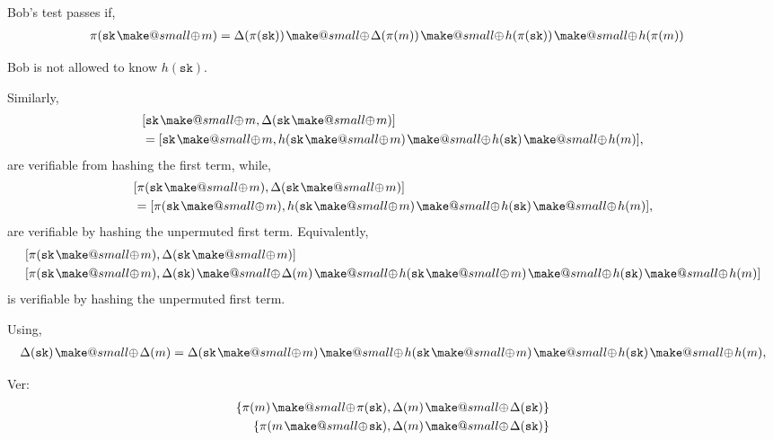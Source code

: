 \documentclass[twocolumn, aps, amsmath, amssymb, nofootinbib, superscriptaddress, longbibliography, doublefloatfix, table-of-contents, eqsecnum, rmp]{revtex4-2}
\makeatletter
\newcommand{\soplus}{{{\hspace{1pt}}{\mathbin{\mathpalette\make@small\oplus}}}{\hspace{1pt}}}
\newcommand{\make@small}[2]{%
  \vcenter{\hbox{%
    \scalebox{0.6}{$\m@th#1#2$}%
  }}%
}
\makeatother
\begin{document}
Bob's test passes if,
\begin{align}
	\pi(\mathtt{sk} \soplus m) &= \Delta(\pi(\mathtt{sk})) \soplus \Delta(\pi(m)) \soplus h(\pi(\mathtt{sk})) \soplus h(\pi(m))
\end{align}

Bob is not allowed to know $h(\mathtt{sk})$.

Similarly,
\begin{align}
	&[\mathtt{sk} \soplus m, \Delta(\mathtt{sk}\soplus m)] \nonumber\\
	&= [\mathtt{sk} \soplus m, h(\mathtt{sk}\soplus m) \soplus h(\mathtt{sk}) \soplus h(m)],
\end{align}
are verifiable from hashing the first term, while,
\begin{align}
	&[\pi(\mathtt{sk} \soplus m), \Delta(\mathtt{sk}\soplus m)] \nonumber\\
	&= [\pi(\mathtt{sk} \soplus m), h(\mathtt{sk}\soplus m) \soplus h(\mathtt{sk}) \soplus h(m)],
\end{align}
are verifiable by hashing the unpermuted first term. Equivalently,
\begin{align}
	&[\pi(\mathtt{sk} \soplus m), \Delta(\mathtt{sk}\soplus m)] \nonumber\\
	&[\pi(\mathtt{sk} \soplus m), \Delta(\mathtt{sk})\soplus \Delta(m) \soplus h(\mathtt{sk}\soplus m) \soplus h(\mathtt{sk}) \soplus h(m)] \nonumber\\\end{align}
is verifiable by hashing the unpermuted first term.

Using,
\begin{align}
	\Delta(\mathtt{sk}) \soplus \Delta(m) &= \Delta(\mathtt{sk} \soplus m) \soplus h(\mathtt{sk} \soplus m)	\soplus h(\mathtt{sk}) \soplus h(m),\nonumber\\
\end{align}


Ver:
\begin{align}
	\{\pi(m)\soplus \pi(\mathtt{sk}), \Delta(m)\soplus \Delta(\mathtt{sk})\} \nonumber\\
	\{\pi(m\soplus \mathtt{sk}), \Delta(m)\soplus \Delta(\mathtt{sk})\}
\end{align}
\end{document}
